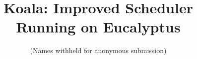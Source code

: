 \documentclass[letterpaper,twocolumn,12pt]{article}
\title{Koala: Improved Scheduler Running on Eucalyptus}
\author{\small (Names withheld for anonymous submission)}
\date{}
\begin{document}
\maketitle









\footnotesize



\normalsize
\newpage

\end{document}

